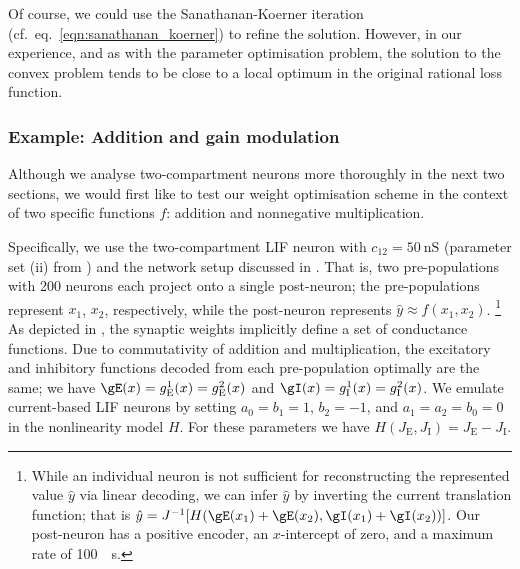 Of course, we could use the Sanathanan-Koerner iteration (cf.~eq.~\ref{eqn:sanathanan_koerner}) to refine the solution.
However, in our experience, and as with the parameter optimisation problem, the solution to the convex problem tends to be close to a local optimum in the original rational loss function.

\subsubsection{Example: Addition and gain modulation}
Although we analyse two-compartment neurons more thoroughly in the next two sections, we would first like to test our weight optimisation scheme in the context of two specific functions $f$: addition and nonnegative multiplication.

Specifically, we use the two-compartment LIF neuron with $c_{12} = \SI{50}{\nano\siemens}$ (parameter set (ii) from )
and the network setup discussed in
.
That is, two pre-populations with 200 neurons each project onto a single post-neuron; the pre-populations represent $x_1$, $x_2$, respectively, while the post-neuron represents $\hat y \approx f(x_1, x_2)$.%
\footnote{While an individual neuron is not sufficient for reconstructing the represented value $\hat y$ via linear decoding, we can infer $\hat y$ by inverting the current translation function; that is $\hat y = J^{-1}[H(\gE(x_1) + \gE(x_2), \gI(x_1) + \gI(x_2))]$.
Our post-neuron has a positive encoder, an $x$-intercept of zero, and a maximum rate of \SI{100}{\per\second}.
}
As depicted in , the synaptic weights implicitly define a set of conductance functions.
Due to commutativity of addition and multiplication, the excitatory and inhibitory functions decoded from each pre-population optimally are the same; we have $\gE(x) = g_\mathrm{E}^1(x) = g_\mathrm{E}^2(x)$ and $\gI(x) = g_\mathrm{I}^1(x) = g_\mathrm{I}^2(x)$.
We emulate current-based LIF neurons by setting $a_0 = b_1 = 1$, $b_2 = -1$, and $a_1 = a_2 = b_0 = 0$ in the nonlinearity model $H$.
For these parameters we have $H(J_\mathrm{E}, J_\mathrm{I}) = J_\mathrm{E} - J_\mathrm{I}$.


